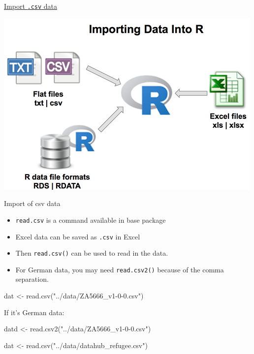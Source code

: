 \documentclass[
  10pt,
  ignorenonframetext,
]{beamer}
\newenvironment{Shaded}{\begin{snugshade}}{\end{snugshade}}
\newcommand{\KeywordTok}[1]{\textcolor[rgb]{0.94,0.87,0.69}{#1}}
\newcommand{\NormalTok}[1]{\textcolor[rgb]{0.80,0.80,0.80}{#1}}
\newcommand{\StringTok}[1]{\textcolor[rgb]{0.80,0.58,0.58}{#1}}
\providecommand{\tightlist}{%
  \setlength{\itemsep}{0pt}\setlength{\parskip}{0pt}}
\begin{document}
\begin{frame}{\href{http://www.sthda.com/english/wiki/importing-data-into-r}{Import
\texttt{.csv} data}}
\protect\hypertarget{import-.csv-data}{}

\includegraphics{figure/importing-data-into-r.png}

\end{frame}

\begin{frame}[fragile]{Import of csv data}
\protect\hypertarget{import-of-csv-data}{}

\begin{itemize}
\tightlist
\item
  \texttt{read.csv} is a command available in base package
\item
  Excel data can be saved as \texttt{.csv} in Excel
\item
  Then \texttt{read.csv()} can be used to read in the data.
\item
  For German data, you may need \texttt{read.csv2()} because of the
  comma separation.
\end{itemize}

\begin{Shaded}
\begin{Highlighting}[]
\NormalTok{dat <-}\StringTok{ }\KeywordTok{read.csv}\NormalTok{(}\StringTok{"../data/ZA5666_v1-0-0.csv"}\NormalTok{)}
\end{Highlighting}
\end{Shaded}

If it's German data:

\begin{Shaded}
\begin{Highlighting}[]
\NormalTok{datd <-}\StringTok{ }\KeywordTok{read.csv2}\NormalTok{(}\StringTok{"../data/ZA5666_v1-0-0.csv"}\NormalTok{)}
\end{Highlighting}
\end{Shaded}

\begin{Shaded}
\begin{Highlighting}[]
\NormalTok{dat <-}\StringTok{ }\KeywordTok{read.csv}\NormalTok{(}\StringTok{"../data/datahub_refugee.csv"}\NormalTok{)}
\end{Highlighting}
\end{Shaded}

\end{frame}
\end{document}
